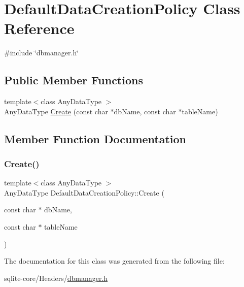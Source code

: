 \hypertarget{classDefaultDataCreationPolicy}{}\section{Default\+Data\+Creation\+Policy Class Reference}
\label{classDefaultDataCreationPolicy}


{\ttfamily \#include \char`\"{}dbmanager.\+h\char`\"{}}

\subsection*{Public Member Functions}
\begin{DoxyCompactItemize}
\item 
{\footnotesize template$<$class Any\+Data\+Type $>$ }\\Any\+Data\+Type \mbox{\hyperlink{classDefaultDataCreationPolicy_a6ac123fffc1c6210dea6709cf4a76c3b}{Create}} (const char $\ast$db\+Name, const char $\ast$table\+Name)
\end{DoxyCompactItemize}


\subsection{Member Function Documentation}
\mbox{\label{classDefaultDataCreationPolicy_a6ac123fffc1c6210dea6709cf4a76c3b}} 
\subsubsection{\texorpdfstring{Create()}{Create()}}
{\footnotesize\ttfamily template$<$class Any\+Data\+Type $>$ \\
Any\+Data\+Type Default\+Data\+Creation\+Policy\+::\+Create (\begin{DoxyParamCaption}\item[{const char $\ast$}]{db\+Name,  }\item[{const char $\ast$}]{table\+Name }\end{DoxyParamCaption})\hspace{0.3cm}{\ttfamily [inline]}}



The documentation for this class was generated from the following file\+:\begin{DoxyCompactItemize}
\item 
sqlite-\/core/\+Headers/\mbox{\hyperlink{dbmanager_8h}{dbmanager.\+h}}\end{DoxyCompactItemize}
